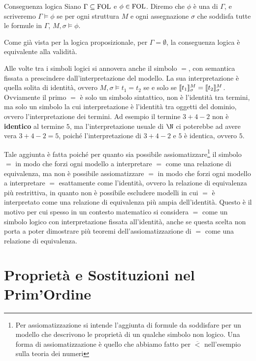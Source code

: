 \begin{definition}{Conseguenza logica}
  Siano \(\Gamma\subseteq \FOL\) e \(\phi\in\FOL\).
  Diremo che \(\phi\) è una  di \(\Gamma\), e scriveremo \(\Gamma\models \phi\) se per ogni struttura \(M\) e ogni assegnazione \(\sigma\) che soddisfa tutte le formule in \(\Gamma\), \(M,\sigma\models \phi\).
\end{definition}

Come già vista per la logica proposizionale, per \(\Gamma = \emptyset\), la conseguenza logica è equivalente alla validità.

Alle volte tra i simboli logici si annovera anche il simbolo \(=\), con semantica fissata a prescindere dall'interpretazione del modello. La sua interpretazione è quella solita di identità, ovvero \(M,\sigma\models t_1 = t_2\) se e solo se \(\den{t_1}[M][\sigma] = \den{t_2}[M][\sigma]\). Ovviamente il primo \(=\) è solo un simbolo sintattico, non è   l'identità tra termini, ma solo un simbolo la cui interpretazione è l'identità tra oggetti del dominio, ovvero l'interpretazione dei termini. Ad esempio il termine \(3+4-2\) non è \textbf{identico} al termine \(5\), ma l'interpretazione usuale di \(\N\) ci poterebbe ad avere vera \(3+4-2 = 5\), poiché l'interpretazione di \(3+4-2\) e \(5\) è identica, ovvero \(5\).

Tale aggiunta è fatta poiché per quanto sia possibile assiomatizzare\footnote{Per assiomatizzazione si intende l'aggiunta di formule da soddisfare per un modello che descrivono le proprietà di un qualche simbolo non logico.
Una forma di assiomatizzazione è quello che abbiamo fatto per \(\overline{<}\) nell'esempio sulla teoria dei numeri} il simbolo \(=\) in modo che forzi ogni modello a interpretare \(=\) come una relazione di equivalenza, ma non è possibile assiomatizzare \(=\) in modo che forzi ogni modello a interpretare \(=\) esattamente come l'identità, ovvero la relazione di equivalenza più restrittiva, in quanto non è possibile escludere modelli in cui \(=\) è interpretato come una relazione di equivalenza più ampia dell'identità. Questo è il motivo per cui spesso in un contesto matematico si considera \(=\) come un simbolo logico con interpretazione fissata all'identità, anche se questa scelta non porta a poter dimostrare più teoremi dell'assiomatizzazione di \(=\) come una relazione di equivalenza.

\section{Proprietà e Sostituzioni nel Prim'Ordine}

